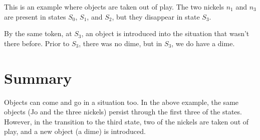 \documentclass[../../../main.tex]{subfiles}
\begin{document}
\noindent
This is an example where objects are taken out of play. The two nickels $n_{1}$ and $n_{3}$ are present in states $S_{0}$, $S_{1}$, and $S_{2}$, but they disappear in state $S_{3}$.

By the same token, at $S_{3}$, an object is introduced into the situation that wasn't there before. Prior to $S_{3}$, there was no dime, but in $S_{3}$, we do have a dime.


\section{Summary}

Objects can come and go in a situation too. In the above example, the same objects (Jo and the three nickels) persist through the first three of the states. However, in the transition to the third state, two of the nickels are taken out of play, and a new object (a dime) is introduced.
\end{document}
